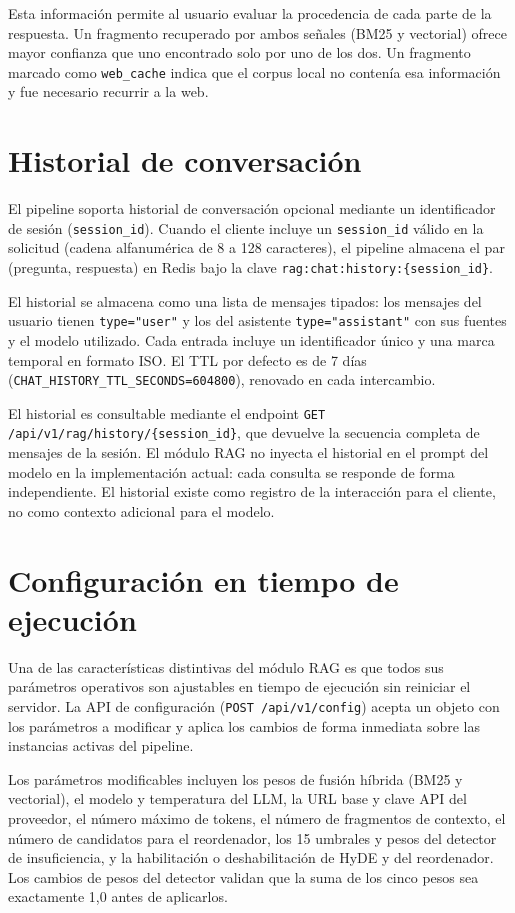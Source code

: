 \documentclass[11pt]{article}
\begin{document}
Esta información permite al usuario evaluar la procedencia de cada parte de la respuesta.
Un fragmento recuperado por ambos señales (BM25 y vectorial) ofrece mayor confianza que uno
encontrado solo por uno de los dos. Un fragmento marcado como \texttt{web\_cache} indica que
el corpus local no contenía esa información y fue necesario recurrir a la web.

\section{Historial de conversación}

El pipeline soporta historial de conversación opcional mediante un identificador de sesión
(\texttt{session\_id}). Cuando el cliente incluye un \texttt{session\_id} válido en la
solicitud (cadena alfanumérica de 8 a 128 caracteres), el pipeline almacena el par
(pregunta, respuesta) en Redis bajo la clave \texttt{rag:chat:history:\{session\_id\}}.

El historial se almacena como una lista de mensajes tipados: los mensajes del usuario tienen
\texttt{type="user"} y los del asistente \texttt{type="assistant"} con sus fuentes y el modelo
utilizado. Cada entrada incluye un identificador único y una marca temporal en formato ISO. El
TTL por defecto es de 7 días (\texttt{CHAT\_HISTORY\_TTL\_SECONDS=604800}), renovado en cada
intercambio.

El historial es consultable mediante el endpoint \texttt{GET /api/v1/rag/history/\{session\_id\}},
que devuelve la secuencia completa de mensajes de la sesión. El módulo RAG no inyecta el
historial en el prompt del modelo en la implementación actual: cada consulta se responde de
forma independiente. El historial existe como registro de la interacción para el cliente, no
como contexto adicional para el modelo.

\section{Configuración en tiempo de ejecución}

Una de las características distintivas del módulo RAG es que todos sus parámetros operativos
son ajustables en tiempo de ejecución sin reiniciar el servidor. La API de configuración
(\texttt{POST /api/v1/config}) acepta un objeto con los parámetros a modificar y aplica los
cambios de forma inmediata sobre las instancias activas del pipeline.

Los parámetros modificables incluyen los pesos de fusión híbrida (BM25 y vectorial), el modelo
y temperatura del LLM, la URL base y clave API del proveedor, el número máximo de tokens, el
número de fragmentos de contexto, el número de candidatos para el reordenador, los 15 umbrales
y pesos del detector de insuficiencia, y la habilitación o deshabilitación de HyDE y del
reordenador. Los cambios de pesos del detector validan que la suma de los cinco pesos sea
exactamente 1,0 antes de aplicarlos.
\end{document}
